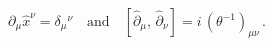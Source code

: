 \begin{equation}
\partial_{\mu}\hat{x}^{\nu}=\delta_{\mu}{}^{\nu}\quad 
\textrm{and}\quad 
\left[ \hat{\partial}_{\mu},\,\hat{\partial}_{\nu}\right]=
i\,(\theta^{-1})_{\mu\nu}\,.\label{eq:3.5}
\end{equation}


